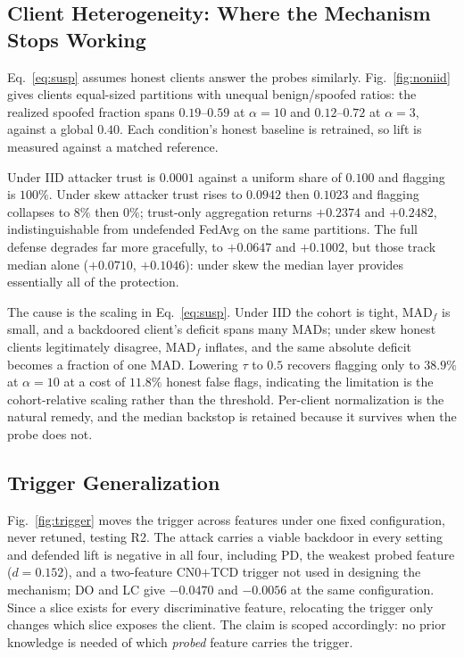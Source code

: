 \documentclass[conference]{IEEEtran}
\begin{document}
\subsection{Client Heterogeneity: Where the Mechanism Stops Working}
\label{sec:noniid}

Eq.~\eqref{eq:susp} assumes honest clients answer the probes similarly.
Fig.~\ref{fig:noniid} gives clients equal-sized partitions with unequal
benign/spoofed ratios: the realized spoofed fraction spans $0.19$--$0.59$ at
$\alpha=10$ and $0.12$--$0.72$ at $\alpha=3$, against a global $0.40$. Each
condition's honest baseline is retrained, so lift is measured against a matched
reference.

Under IID attacker trust is $0.0001$ against a uniform share of $0.100$ and
flagging is $100\%$. Under skew attacker trust rises to $0.0942$ then $0.1023$
and flagging collapses to $8\%$ then $0\%$; trust-only aggregation returns
$+0.2374$ and $+0.2482$, indistinguishable from undefended FedAvg on the same
partitions. The full defense degrades far more gracefully, to $+0.0647$ and
$+0.1002$, but those track median alone ($+0.0710$, $+0.1046$): under skew the
median layer provides essentially all of the protection.

The cause is the scaling in Eq.~\eqref{eq:susp}. Under IID the cohort is tight,
$\mathrm{MAD}_f$ is small, and a backdoored client's deficit spans many MADs;
under skew honest clients legitimately disagree, $\mathrm{MAD}_f$ inflates, and
the same absolute deficit becomes a fraction of one MAD. Lowering $\tau$ to
$0.5$ recovers flagging only to $38.9\%$ at $\alpha=10$ at a cost of $11.8\%$
honest false flags, indicating the limitation is the cohort-relative scaling
rather than the threshold. Per-client normalization is the natural remedy, and
the median backstop is retained because it survives when the probe does not.


\subsection{Trigger Generalization}

Fig.~\ref{fig:trigger} moves the trigger across features under one fixed
configuration, never retuned, testing R2. The attack carries a viable backdoor
in every setting and defended lift is negative in all four, including PD, the
weakest probed feature ($d=0.152$), and a two-feature CN0$+$TCD trigger not
used in designing the mechanism; DO and LC give $-0.0470$ and $-0.0056$ at the
same configuration. Since a slice exists for every discriminative feature,
relocating the trigger only changes which slice exposes the client. The claim
is scoped accordingly: no prior knowledge is needed of which \emph{probed}
feature carries the trigger.
\end{document}
